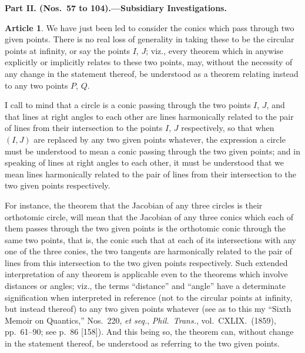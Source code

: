 \documentclass[11pt,a4paper]{article}
\theoremstyle{definition}
\newtheorem{art}{Article}
\begin{document}
\newpage
\begin{center}
\textbf{Part II. (Nos.\ 57 to 104).---Subsidiary Investigations.}
\end{center}

\vspace{0.5em}

\begin{art}
We have just been led to consider the conics which pass through two given points. There is no real loss of generality in taking these to be the circular points at infinity, or say the points $I$, $J$; viz., every theorem which in anywise explicitly or implicitly relates to these two points, may, without the necessity of any change in the statement thereof, be understood as a theorem relating instead to any two points $P$, $Q$.

I call to mind that a circle is a conic passing through the two points $I$, $J$, and that lines at right angles to each other are lines harmonically related to the pair of lines from their intersection to the points $I$, $J$ respectively, so that when $(I, J)$ are replaced by any two given points whatever, the expression a circle must be understood to mean a conic passing through the two given points; and in speaking of lines at right angles to each other, it must be understood that we mean lines harmonically related to the pair of lines from their intersection to the two given points respectively.

For instance, the theorem that the Jacobian of any three circles is their orthotomic circle, will mean that the Jacobian of any three conics which each of them passes through the two given points is the orthotomic conic through the same two points, that is, the conic such that at each of its intersections with any one of the three conies, the two tangents are harmonically related to the pair of lines from this intersection to the two given points respectively. Such extended interpretation of any theorem is applicable even to the theorems which involve distances or angles; viz., the terms ``distance'' and ``angle'' have a determinate signification when interpreted in reference (not to the circular points at infinity, but instead thereof) to any two given points whatever (see as to this my ``Sixth Memoir on Quantics,'' Nos.\ 220, \textit{et seq.}, \textit{Phil.\ Trans.}, vol.\ CXLIX.\ (1859), pp.\ 61--90; see p.\ 86 [158]). And this being so, the theorem can, without change in the statement thereof, be understood as referring to the two given points.
\end{art}
\end{document}
